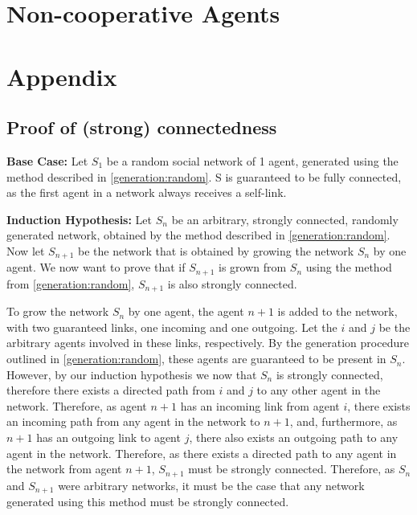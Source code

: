 \documentclass{article}
\begin{document}
\section{Non-cooperative Agents}

\newpage
\section{Appendix}
\subsection{Proof of (strong) connectedness}

\textbf{Base Case:} \newline
Let $S_1$ be a random social network of 1 agent, generated using the method described in \ref{generation:random}.
S is guaranteed to be fully connected, as the first agent in a network always receives a self-link.\newline

\textbf{Induction Hypothesis:}\newline
Let $S_n$ be an arbitrary, strongly connected, randomly generated network, obtained by the method described in \ref{generation:random}. Now let $S_{n+1}$ be the network that is obtained by growing the network $S_n$ by one agent. We now want to prove that if $S_{n+1}$ is grown from $S_n$ using the method from \ref{generation:random}, $S_{n+1}$ is also strongly connected.\newline

To grow the network $S_n$ by one agent, the agent $n+1$ is added to the network, with two guaranteed links, one incoming and one outgoing. Let the $i$ and $j$ be the arbitrary agents involved in these links, respectively. By the generation procedure outlined in \ref{generation:random}, these agents are guaranteed to be present in $S_n$. However, by our induction hypothesis we now that $S_n$ is strongly connected, therefore there exists a directed path from $i$ and $j$ to any other agent in the network. Therefore, as agent $n+1$ has an incoming link from agent $i$, there exists an incoming path from any agent in the network to $n+1$, and, furthermore, as $n+1$ has an outgoing link to agent $j$, there also exists an outgoing path to any agent in the network. Therefore, as there exists a directed path to any agent in the network from agent $n+1$, $S_{n+1}$ must be strongly connected.\newline
Therefore, as $S_n$ and $S_{n+1}$ were arbitrary networks, it must be the case that any network generated using this method must be strongly connected.\newline




\newpage
\end{document}
